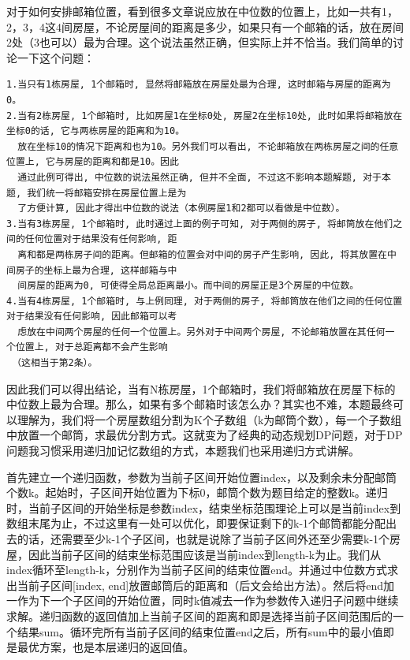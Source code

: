 \documentclass[9pt, b5paaper]{book}
\begin{document}
对于如何安排邮箱位置，看到很多文章说应放在中位数的位置上，比如一共有1，2，3，4这4间房屋，不论房屋间的距离是多少，如果只有一个邮箱的话，放在房间2处（3也可以）最为合理。这个说法虽然正确，但实际上并不恰当。我们简单的讨论一下这个问题：
\begin{verbatim}
1.当只有1栋房屋, 1个邮箱时, 显然将邮箱放在房屋处最为合理, 这时邮箱与房屋的距离为0。
2.当有2栋房屋, 1个邮箱时, 比如房屋1在坐标0处, 房屋2在坐标10处, 此时如果将邮箱放在坐标0的话, 它与两栋房屋的距离和为10。
  放在坐标10的情况下距离和也为10。另外我们可以看出, 不论邮箱放在两栋房屋之间的任意位置上, 它与房屋的距离和都是10。因此
  通过此例可得出, 中位数的说法虽然正确, 但并不全面, 不过这不影响本题解题, 对于本题, 我们统一将邮箱安排在房屋位置上是为
  了方便计算, 因此才得出中位数的说法（本例房屋1和2都可以看做是中位数）。
3.当有3栋房屋, 1个邮箱时, 此时通过上面的例子可知, 对于两侧的房子, 将邮筒放在他们之间的任何位置对于结果没有任何影响, 距
  离和都是两栋房子间的距离。但邮箱的位置会对中间的房子产生影响, 因此, 将其放置在中间房子的坐标上最为合理, 这样邮箱与中
  间房屋的距离为0, 可使得全局总距离最小。而中间的房屋正是3个房屋的中位数。
4.当有4栋房屋, 1个邮箱时, 与上例同理, 对于两侧的房子, 将邮筒放在他们之间的任何位置对于结果没有任何影响, 因此邮箱可以考
  虑放在中间两个房屋的任何一个位置上。另外对于中间两个房屋, 不论邮箱放置在其任何一个位置上, 对于总距离都不会产生影响
 （这相当于第2条）。
\end{verbatim}

因此我们可以得出结论，当有N栋房屋，1个邮箱时，我们将邮箱放在房屋下标的中位数上最为合理。那么，如果有多个邮箱时该怎么办？其实也不难，本题最终可以理解为，我们将一个房屋数组分割为K个子数组（k为邮筒个数），每一个子数组中放置一个邮筒，求最优分割方式。这就变为了经典的动态规划DP问题，对于DP问题我习惯采用递归加记忆数组的方式，本题我们也采用递归方式讲解。

首先建立一个递归函数，参数为当前子区间开始位置index，以及剩余未分配邮筒个数k。起始时，子区间开始位置为下标0，邮筒个数为题目给定的整数k。递归时，当前子区间的开始坐标是参数index，结束坐标范围理论上可以是当前index到数组末尾为止，不过这里有一处可以优化，即要保证剩下的k-1个邮筒都能分配出去的话，还需要至少k-1个子区间，也就是说除了当前子区间外还至少需要k-1个房屋，因此当前子区间的结束坐标范围应该是当前index到length-k为止。我们从index循环至length-k，分别作为当前子区间的结束位置end。并通过中位数方式求出当前子区间[index, end]放置邮筒后的距离和（后文会给出方法）。然后将end加一作为下一个子区间的开始位置，同时k值减去一作为参数传入递归子问题中继续求解。递归函数的返回值加上当前子区间的距离和即是选择当前子区间范围后的一个结果sum。循环完所有当前子区间的结束位置end之后，所有sum中的最小值即是最优方案，也是本层递归的返回值。
\end{document}

